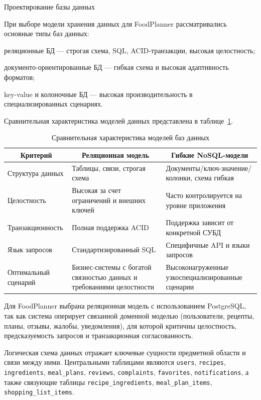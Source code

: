 Проектирование базы данных

При выборе модели хранения данных для FoodPlanner рассматривались основные типы баз данных:
\begin{compactlist}
  \item реляционные БД --- строгая схема, SQL, ACID-транзакции, высокая целостность;
  \item документо-ориентированные БД --- гибкая схема и высокая адаптивность форматов;
  \item key-value и колоночные БД --- высокая производительность в специализированных сценариях.
\end{compactlist}

Сравнительная характеристика моделей данных представлена в таблице~\ref{tab:db-model-compare}.

\begin{table}[H]
\caption{Сравнительная характеристика моделей баз данных}
\label{tab:db-model-compare}
\small
\begin{tabularx}{\textwidth}{|p{}|p{}|X|}
\hline
\multicolumn{1}{|c|}{Критерий} & \multicolumn{1}{c|}{Реляционная модель} & \multicolumn{1}{c|}{Гибкие NoSQL-модели} \\ \hline
Структура данных & Таблицы, связи, строгая схема & Документы/ключ-значение/колонки, схема гибкая \\ \hline
Целостность & Высокая за счет ограничений и внешних ключей & Часто контролируется на уровне приложения \\ \hline
Транзакционность & Полная поддержка ACID & Поддержка зависит от конкретной СУБД \\ \hline
Язык запросов & Стандартизированный SQL & Специфичные API и языки запросов \\ \hline
Оптимальный сценарий & Бизнес-системы с богатой связностью данных и требованиями целостности & Высоконагруженные узкоспециализированные сценарии \\ \hline
\end{tabularx}
\normalsize
\end{table}

Для FoodPlanner выбрана реляционная модель с использованием PostgreSQL, так как система оперирует связанной доменной моделью (пользователи, рецепты, планы, отзывы, жалобы, уведомления), для которой критичны целостность, предсказуемость запросов и транзакционная согласованность.

Логическая схема данных отражает ключевые сущности предметной области и связи между ними. Центральными таблицами являются \texttt{users}, \texttt{recipes}, \texttt{ingredients}, \texttt{meal\_plans}, \texttt{reviews}, \texttt{complaints}, \texttt{favorites}, \texttt{notifications}, а также связующие таблицы \texttt{recipe\_ingredients}, \texttt{meal\_plan\_items}, \texttt{shopping\_list\_items}.

